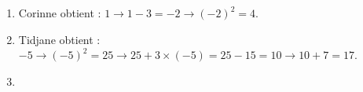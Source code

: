 
\bigskip

%

\begin{enumerate}
\item %

Corinne obtient : $1 \to 1 - 3 = - 2 \to (- 2)^2 = 4$.
\item %
Tidjane obtient : $- 5 \to (- 5)^2 = 25 \to 25 + 3 \times (- 5) = 25 - 15 = 10 \to 10 + 7 = 17$.
\item %


\end{enumerate}
